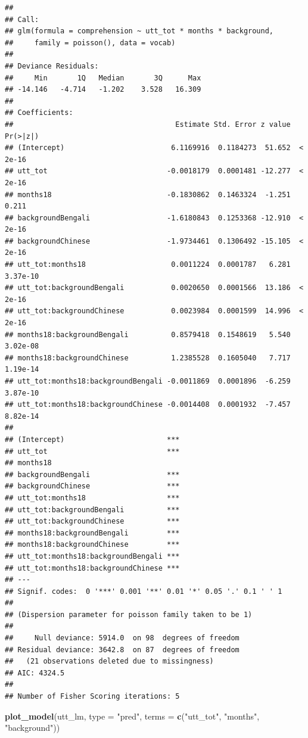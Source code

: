 \documentclass[]{article}
\newenvironment{Shaded}{\begin{snugshade}}{\end{snugshade}}
\newcommand{\DataTypeTok}[1]{\textcolor[rgb]{0.13,0.29,0.53}{#1}}
\newcommand{\KeywordTok}[1]{\textcolor[rgb]{0.13,0.29,0.53}{\textbf{#1}}}
\newcommand{\NormalTok}[1]{#1}
\newcommand{\StringTok}[1]{\textcolor[rgb]{0.31,0.60,0.02}{#1}}
\begin{document}
\begin{verbatim}
## 
## Call:
## glm(formula = comprehension ~ utt_tot * months * background, 
##     family = poisson(), data = vocab)
## 
## Deviance Residuals: 
##     Min       1Q   Median       3Q      Max  
## -14.146   -4.714   -1.202    3.528   16.309  
## 
## Coefficients:
##                                      Estimate Std. Error z value Pr(>|z|)
## (Intercept)                         6.1169916  0.1184273  51.652  < 2e-16
## utt_tot                            -0.0018179  0.0001481 -12.277  < 2e-16
## months18                           -0.1830862  0.1463324  -1.251    0.211
## backgroundBengali                  -1.6180843  0.1253368 -12.910  < 2e-16
## backgroundChinese                  -1.9734461  0.1306492 -15.105  < 2e-16
## utt_tot:months18                    0.0011224  0.0001787   6.281 3.37e-10
## utt_tot:backgroundBengali           0.0020650  0.0001566  13.186  < 2e-16
## utt_tot:backgroundChinese           0.0023984  0.0001599  14.996  < 2e-16
## months18:backgroundBengali          0.8579418  0.1548619   5.540 3.02e-08
## months18:backgroundChinese          1.2385528  0.1605040   7.717 1.19e-14
## utt_tot:months18:backgroundBengali -0.0011869  0.0001896  -6.259 3.87e-10
## utt_tot:months18:backgroundChinese -0.0014408  0.0001932  -7.457 8.82e-14
##                                       
## (Intercept)                        ***
## utt_tot                            ***
## months18                              
## backgroundBengali                  ***
## backgroundChinese                  ***
## utt_tot:months18                   ***
## utt_tot:backgroundBengali          ***
## utt_tot:backgroundChinese          ***
## months18:backgroundBengali         ***
## months18:backgroundChinese         ***
## utt_tot:months18:backgroundBengali ***
## utt_tot:months18:backgroundChinese ***
## ---
## Signif. codes:  0 '***' 0.001 '**' 0.01 '*' 0.05 '.' 0.1 ' ' 1
## 
## (Dispersion parameter for poisson family taken to be 1)
## 
##     Null deviance: 5914.0  on 98  degrees of freedom
## Residual deviance: 3642.8  on 87  degrees of freedom
##   (21 observations deleted due to missingness)
## AIC: 4324.5
## 
## Number of Fisher Scoring iterations: 5
\end{verbatim}

\begin{Shaded}
\begin{Highlighting}[]
\KeywordTok{plot_model}\NormalTok{(utt_lm, }\DataTypeTok{type =} \StringTok{"pred"}\NormalTok{, }\DataTypeTok{terms =} \KeywordTok{c}\NormalTok{(}\StringTok{"utt_tot"}\NormalTok{, }\StringTok{"months"}\NormalTok{, }\StringTok{"background"}\NormalTok{))}
\end{Highlighting}
\end{Shaded}
\end{document}
